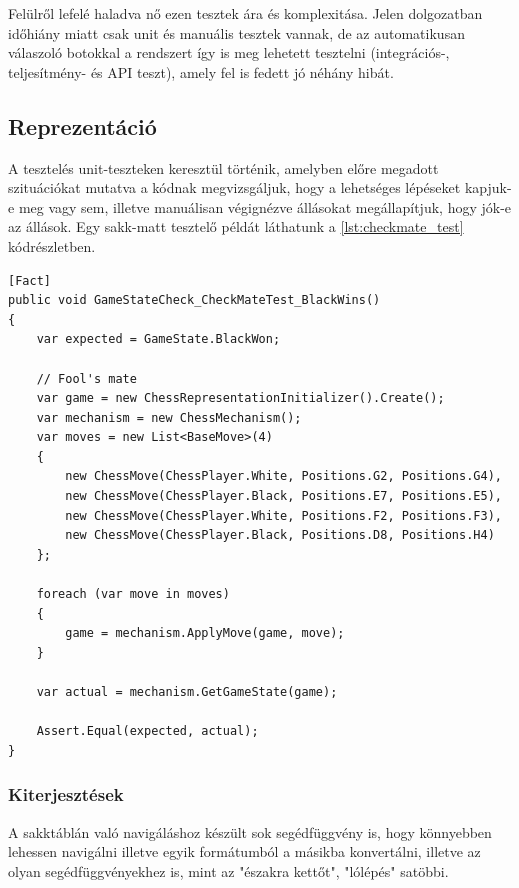 \documentclass[twoside, a4paper, 12pt]{article}
\begin{document}
Felülről lefelé haladva nő ezen tesztek ára és komplexitása. Jelen dolgozatban időhiány miatt csak unit és manuális tesztek vannak, de az automatikusan válaszoló botokkal a rendszert így is meg lehetett tesztelni (integrációs-, teljesítmény- és API teszt), amely fel is fedett jó néhány hibát.

\subsection{Reprezentáció}
A tesztelés unit-teszteken keresztül történik, amelyben előre megadott szituációkat mutatva a kódnak megvizsgáljuk, hogy a lehetséges lépéseket kapjuk-e meg vagy sem, illetve manuálisan végignézve állásokat megállapítjuk, hogy jók-e az állások. Egy sakk-matt tesztelő példát láthatunk a \ref{lst:checkmate_test} kódrészletben.

\begin{lstlisting}[caption=Sakk-matt detektálás teszt, label=lst:checkmate_test, float]
[Fact]
public void GameStateCheck_CheckMateTest_BlackWins()
{
	var expected = GameState.BlackWon;
	
	// Fool's mate
	var game = new ChessRepresentationInitializer().Create();
	var mechanism = new ChessMechanism();
	var moves = new List<BaseMove>(4)
	{
		new ChessMove(ChessPlayer.White, Positions.G2, Positions.G4),
		new ChessMove(ChessPlayer.Black, Positions.E7, Positions.E5),
		new ChessMove(ChessPlayer.White, Positions.F2, Positions.F3),
		new ChessMove(ChessPlayer.Black, Positions.D8, Positions.H4)
	};
	
	foreach (var move in moves)
	{
		game = mechanism.ApplyMove(game, move);
	}
	
	var actual = mechanism.GetGameState(game);
	
	Assert.Equal(expected, actual);
}
\end{lstlisting}
\subsubsection{Kiterjesztések}
A sakktáblán való navigáláshoz készült sok segédfüggvény is, hogy könnyebben lehessen navigálni illetve egyik formátumból a másikba konvertálni, illetve az olyan segédfüggvényekhez is, mint az "északra kettőt", "lólépés" satöbbi.
\end{document}
